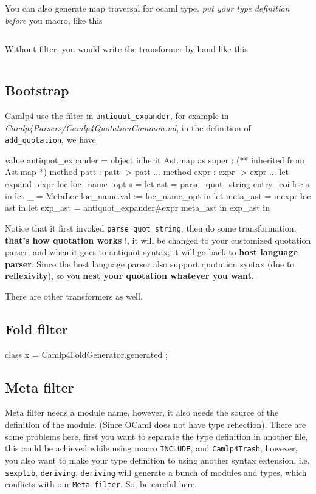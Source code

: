 You can also generate map traversal for ocaml type. \emph{put your
  type definition before} you macro, like this
\inputminted[fontsize=\scriptsize, fontsize=\scriptsize, ]{ocaml}{camlp4/code/ast_map.ml}
Without filter, you would write the transformer by hand like this 
\inputminted[fontsize=\scriptsize, fontsize=\scriptsize, ]{ocaml}{camlp4/code/ast_map_o.ml}

\subsection{Bootstrap}
Camlp4 use the filter in \verb|antiquot_expander|, for example in
\textit{Camlp4Parsers/Camlp4QuotationCommon.ml}, in the definition of
\verb|add_quotation|, we have


\begin{ocamlcode}
value antiquot_expander = object
  inherit Ast.map as super ; (** inherited from Ast.map *)
  method patt : patt -> patt ...
  method expr : expr -> expr ...
let expand_expr loc loc_name_opt s =
  let ast = parse_quot_string entry_eoi loc s in
  let _ = MetaLoc.loc_name.val := loc_name_opt in
  let meta_ast = mexpr loc ast in
  let exp_ast = antiquot_expander#expr meta_ast in
  exp_ast in
\end{ocamlcode}


Notice that it first invoked \verb|parse_quot_string|, then do some
transformation, \textbf{ that's how quotation works} !, it will be
changed to your customized quotation parser, and when it goes to
antiquot syntax, it will go back to \textbf{ host language
  parser}. Since the host language parser also support quotation
syntax (due to \textbf{ reflexivity}), so you \textbf{ nest your
  quotation whatever you want.}

There are other transformers as well.


\subsection{Fold filter}

\begin{ocamlcode}
  class x = Camlp4FoldGenerator.generated ;
\end{ocamlcode}

\subsection{Meta filter}
Meta filter needs a module name, however, it also needs the source of
the definition of the module. (Since OCaml does not have type
reflection). There are some problems here, first you want to separate
the type definition in another file, this could be achieved while
using macro \verb|INCLUDE|, and \verb|Camlp4Trash|, however, you also
want to make your type definition to using another syntax extension,
i.e, \verb|sexplib|, \verb|deriving|, \verb|deriving| will generate a
bunch of modules and types, which conflicts with our
\verb|Meta filter|. So, be careful here.


